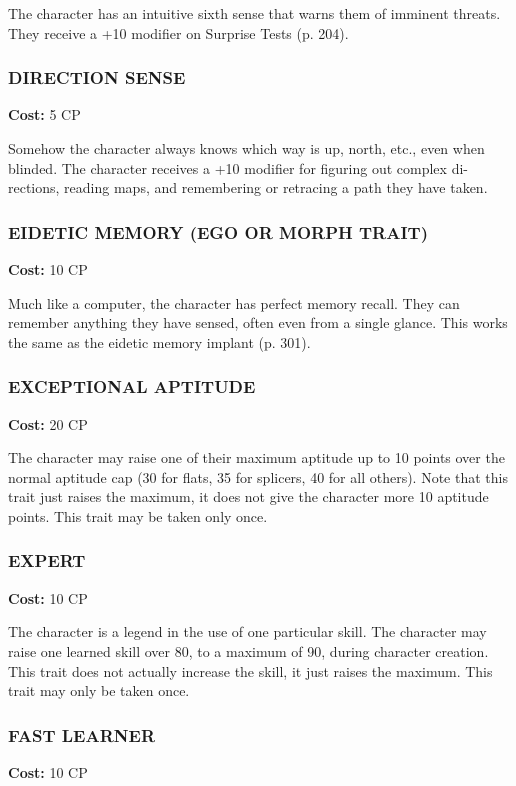 The character has an intuitive sixth sense that warns
them of imminent threats. They receive a +10 modifier
on Surprise Tests (p. 204).

\subsubsection{DIRECTION SENSE}
\textbf{Cost:} 5 CP

Somehow the character always knows which way
is up, north, etc., even when blinded. The character
receives a +10 modifier for figuring out complex di-
rections, reading maps, and remembering or retracing
a path they have taken.

\subsubsection{EIDETIC MEMORY (EGO OR MORPH TRAIT)}
\textbf{Cost:} 10 CP

Much like a computer, the character has perfect
memory recall. They can remember anything they have
sensed, often even from a single glance. This works the
same as the eidetic memory implant (p. 301).

\subsubsection{EXCEPTIONAL APTITUDE}
\textbf{Cost:} 20 CP

The character may raise one of their maximum
aptitude up to 10 points over the normal aptitude cap
(30 for flats, 35 for splicers, 40 for all others). Note
that this trait just raises the maximum, it does not
give the character more 10 aptitude points. This trait
may be taken only once.

\subsubsection{EXPERT}
\textbf{Cost:} 10 CP

The character is a legend in the use of one particular
skill. The character may raise one learned skill over 80,
to a maximum of 90, during character creation. This
trait does not actually increase the skill, it just raises
the maximum. This trait may only be taken once.

\subsubsection{FAST LEARNER}
\textbf{Cost:} 10 CP


